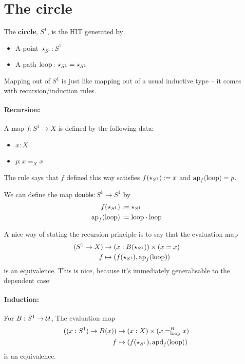 \documentclass[10pt,oneside,leqno,openright]{memoir}
\begin{document}
\section*{The circle}
\begin{definition}
  The \textbf{circle}, $S^1$, is the HIT generated by
  \begin{itemize}
  \item A point $\star_{S^1} : S^1$
  \item A path $\mathrm{loop} : \star_{S^1} = \star_{S^1}$    
  \end{itemize}
\end{definition}
Mapping out of $S^1$ is just like mapping out of a usual inductive type -- it comes with recursion/induction rules.
%
\paragraph{Recursion:} A map $f: S^1 \to X$ is defined by the following data:
\begin{itemize}
\item $x : X$
\item $p : x =_X x$
\end{itemize}
The rule says that $f$ defined this way satisfies $f(\star_{S^1}) := x$ and $\operatorname{ap}_f(\mathrm{loop}) = p$.
\begin{example}
  We can define the map $\mathsf{double} : S^1 \to S^1$ by
  \begin{align*}
    f(\star_{S^1}) &:= \star_{S^1}\\
    \operatorname{ap}_f(\mathrm{loop}) &:= \mathrm{loop} \cdot \mathrm{loop} 
  \end{align*}
\end{example}
A nice way of stating the recursion principle is to say that the evaluation map
\begin{align*}
  (S^1 \to X) &\to (x : B(\star_{S^1})) \times (x = x)\\
  f &\mapsto (f(\star_{S^1}) , \operatorname{ap}_f(\mathrm{loop}))
\end{align*}
is an equivalence.
%
This is nice, because it's immediately generalisable to the dependent case:
\paragraph{Induction:}
For $B : S^1 \to \mathcal{U}$, The evaluation map
\begin{align*}
  ((x : S^1) \to B(x)) &\to (x : X) \times (x =^B_{\mathrm{loop}} x)\\
  f &\mapsto (f(\star_{S^1}) , \operatorname{apd}_f(\mathrm{loop}))
\end{align*}
is an equivalence.
\end{document}
